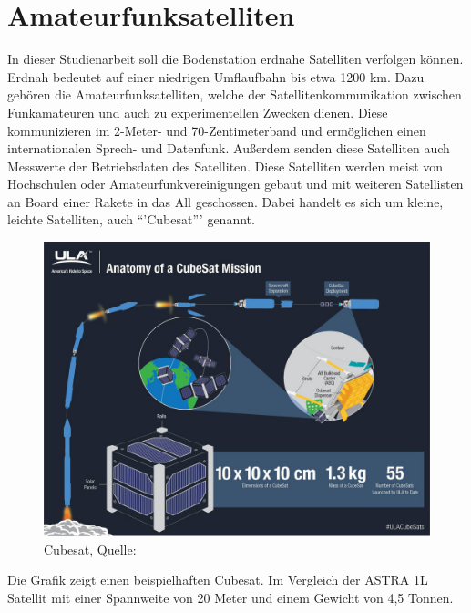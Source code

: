 
\chapter{Amateurfunksatelliten}
In dieser Studienarbeit soll die Bodenstation erdnahe Satelliten verfolgen können. Erdnah bedeutet auf einer niedrigen Umflaufbahn bis etwa 1200 km. 
Dazu gehören die Amateurfunksatelliten, welche der Satellitenkommunikation zwischen Funkamateuren und auch zu experimentellen Zwecken dienen. 
Diese kommunizieren im 2-Meter- und 70-Zentimeterband und ermöglichen einen internationalen Sprech- und Datenfunk. Außerdem senden diese Satelliten
auch Messwerte der Betriebsdaten des Satelliten. Diese Satelliten werden meist von Hochschulen oder Amateurfunkvereinigungen gebaut und mit weiteren 
Satellisten an Board einer Rakete in das All geschossen. Dabei handelt es sich um kleine, leichte Satelliten, auch ``'Cubesat''' genannt.
\begin{figure}[h]
 \centering
 \includegraphics[width=0.8\linewidth]{./images/cubesat}
 \caption{Cubesat, Quelle: \cite{cubesat}}
 \label{fig:cubesat}
\end{figure}
Die Grafik zeigt einen beispielhaften Cubesat. Im Vergleich der ASTRA 1L Satellit mit einer Spannweite von 20 Meter und einem Gewicht von 4,5 Tonnen.

\newpar
